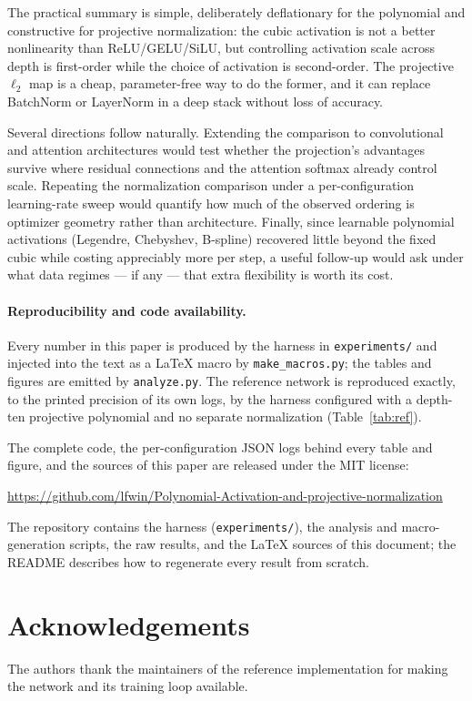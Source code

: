The practical summary is simple, deliberately deflationary for the polynomial
and constructive for projective normalization: the cubic activation is not a
better nonlinearity than ReLU/GELU/SiLU, but controlling activation scale
across depth is first-order while the choice of activation is second-order. The
projective $\ell_2$ map is a cheap, parameter-free way to do the former, and it
can replace BatchNorm or LayerNorm in a deep stack without loss of accuracy.

Several directions follow naturally. Extending the comparison to convolutional
and attention architectures would test whether the projection's advantages
survive where residual connections and the attention softmax already control
scale. Repeating the normalization comparison under a per-configuration
learning-rate sweep would quantify how much of the observed ordering is
optimizer geometry rather than architecture. Finally, since learnable
polynomial activations (Legendre, Chebyshev, B-spline) recovered little beyond
the fixed cubic while costing appreciably more per step, a useful follow-up
would ask under what data regimes --- if any --- that extra flexibility is
worth its cost.

\paragraph{Reproducibility and code availability.}
Every number in this paper is produced by the harness in
\texttt{experiments/} and injected into the text as a \LaTeX{} macro by
\texttt{make\_macros.py}; the tables and figures are emitted by
\texttt{analyze.py}. The reference network is reproduced exactly, to the
printed precision of its own logs, by the harness configured with a depth-ten
projective polynomial and no separate normalization
(Table~\ref{tab:ref}).

The complete code, the per-configuration JSON logs behind every table and
figure, and the sources of this paper are released under the MIT license:

\begin{center}
\url{https://github.com/lfwin/Polynomial-Activation-and-projective-normalization}
\end{center}

\noindent
The repository contains the harness (\texttt{experiments/}), the analysis and
macro-generation scripts, the raw results, and the \LaTeX{} sources of this
document; the README describes how to regenerate every result from scratch.



\section*{Acknowledgements}

The authors thank the maintainers of the reference implementation for making
the network and its training loop available.
